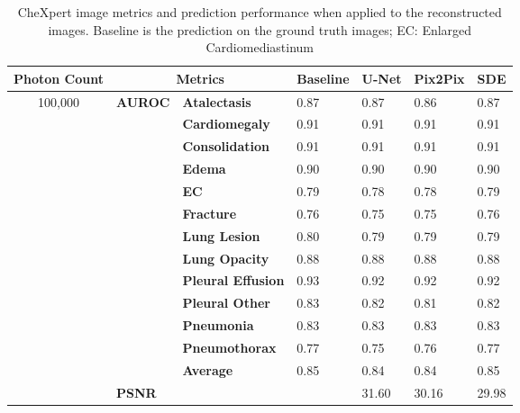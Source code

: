 \begin{table}[]
\centering
\caption{CheXpert image metrics and prediction performance when applied to the reconstructed images. Baseline is the prediction on the ground truth images; EC: Enlarged Cardiomediastinum}\label{tab:chex_perf}
\begin{tabular}{cll|llll}
\hline
\multicolumn{1}{l}{\textbf{Photon Count}} & \multicolumn{2}{c|}{\textbf{Metrics}}         & \textbf{Baseline} & \textbf{U-Net} & \textbf{Pix2Pix} & \textbf{SDE} \\ \hline
\multirow{15}{*}{100,000}               & \multirow{13}{*}{\textbf{AUROC}} & \textbf{Atalectasis}  & 0.87 & 0.87 & 0.86 & 0.87 \\
                                 &                        & \textbf{Cardiomegaly} & 0.91 & 0.91 & 0.91 & 0.91 \\
                                 &                        & \textbf{Consolidation} & 0.91 & 0.91 & 0.91 & 0.91 \\ 
                                 &                        & \textbf{Edema} & 0.90 & 0.90 & 0.90 & 0.90 \\ 
                                 &                        & \textbf{EC} & 0.79 & 0.78 & 0.78 & 0.79 \\ 
                                 &                        & \textbf{Fracture} & 0.76 & 0.75 & 0.75 & 0.76 \\ 
                                 &                        & \textbf{Lung Lesion} & 0.80 & 0.79 & 0.79 & 0.79 \\ 
                                 &                        & \textbf{Lung Opacity} & 0.88 & 0.88 & 0.88 & 0.88 \\ 
                                 &                        & \textbf{Pleural Effusion} & 0.93 & 0.92 & 0.92 & 0.92 \\ 
                                 &                        & \textbf{Pleural Other} & 0.83 & 0.82 & 0.81 & 0.82 \\ 
                                 &                        & \textbf{Pneumonia} & 0.83 & 0.83 & 0.83 & 0.83 \\ 
                                 &                        & \textbf{Pneumothorax} & 0.77 & 0.75 & 0.76 & 0.77 \\
                                 &                        & \textbf{Average} & 0.85 & 0.84 & 0.84 & 0.85 \\ \cline{2-3}
                                 & \multicolumn{2}{l|}{\textbf{PSNR}}            & \cellcolor[HTML]{C0C0C0} & 31.60 & 30.16 & 29.98 \\

\end{tabular}
\end{table}
